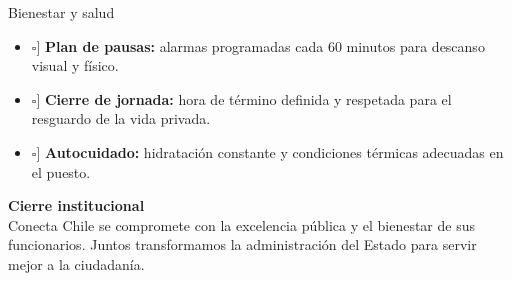 \documentclass[11pt,letterpaper]{article}
\newcommand{\checkbox}{\makebox[1.2em][l]{$\square$}}
\newcommand{\strong}[1]{\textbf{\textcolor{AzulProfundo}{#1}}}
\begin{document}
\begin{KeyBox}{Bienestar y salud}
\begin{itemize}
    \item[\checkbox] \strong{Plan de pausas:} alarmas programadas cada 60 minutos para descanso visual y físico.
    \item[\checkbox] \strong{Cierre de jornada:} hora de término definida y respetada para el resguardo de la vida privada.
    \item[\checkbox] \strong{Autocuidado:} hidratación constante y condiciones térmicas adecuadas en el puesto.
\end{itemize}
\end{KeyBox}

\vspace{0.8cm}
\begin{tcolorbox}[enhanced,colback=AzulProfundo,colframe=AzulProfundo,arc=2mm,boxrule=0pt,left=10pt,right=10pt,top=10pt,bottom=10pt]
{\color{BlancoIndustrial}\large\textbf{Cierre institucional}}\\[0.2cm]
{\color{GrisTecnico}Conecta Chile se compromete con la excelencia pública y el bienestar de sus funcionarios. Juntos transformamos la administración del Estado para servir mejor a la ciudadanía.}
\end{tcolorbox}
\end{document}
